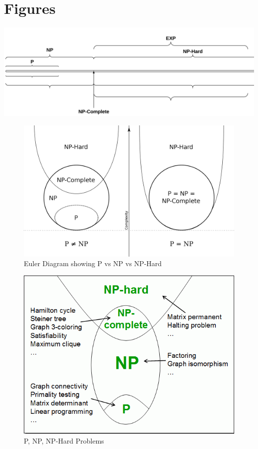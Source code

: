 \documentclass[14pt]{article}
\theoremstyle{definition}
\theoremstyle{definition}
\begin{document}
\section*{Figures}
\begin{center}
\includegraphics[scale=.75, angle = 90]{Time_Complexity_Line.png}
\end{center}

\begin{figure}
\centering
\includegraphics[scale=0.25]{P_vs_NP_Euler_Diagram}
\caption{Euler Diagram showing P vs NP vs NP-Hard}
\end{figure}
\newpage
\begin{figure}
\includegraphics[scale=.8]{examples_time_complexity.png}
\caption{P, NP, NP-Hard Problems}
\end{figure}



\vspace*{1 cm}


\end{document}
